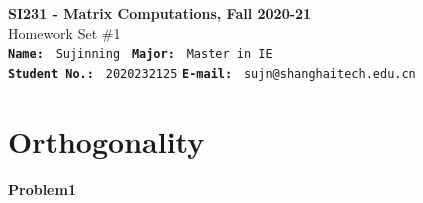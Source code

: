 \documentclass[english,onecolumn,UTF8]{IEEEtran}
\begin{document}
\begin{center}
\textbf{SI231 - Matrix Computations, Fall 2020-21} \\ Homework Set \#1\\
\texttt{\textbf{Name:}}   	\texttt{ Sujinning }  		\hspace{1bp}
\texttt{\textbf{Major:}}  	\texttt{ Master in IE } 	\\
\texttt{\textbf{Student No.:}} 	\texttt{ 2020232125}     \hspace{1bp}
\texttt{\textbf{E-mail:}} 	\texttt{ sujn@shanghaitech.edu.cn}
\par\end{center}

\section{Orthogonality}
\textbf{Problem1}
\end{document}
